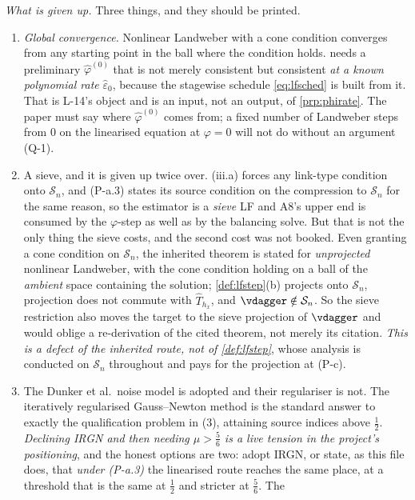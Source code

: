 \begin{remark}
\emph{What is given up.} Three things, and they should be printed.
\begin{enumerate}
\item[(a)] \emph{Global convergence.} Nonlinear Landweber with a cone condition converges from any
starting point in the ball where the condition holds.  needs a preliminary
$\hat\varphi^{(0)}$ that is not merely consistent but consistent \emph{at a known polynomial rate}
$\hat\varepsilon_0$, because the stagewise schedule \eqref{eq:lfsched} is built from it. That is L-14's
object and is an input, not an output, of \cref{prp:phirate}. The paper must say where
$\hat\varphi^{(0)}$ comes from; a fixed number of Landweber steps from $0$ on the linearised equation
at $\varphi=0$ will not do without an argument (Q-1).
\item[(b)] A sieve, and it is given up twice over. (iii.a) forces any
link-type condition onto $\mathcal S_n$, and (P-a.3) states its source condition on the compression to
$\mathcal S_n$ for the same reason, so the estimator is a \emph{sieve} LF and A8's upper end is
consumed by the $\varphi$-step as well as by the balancing solve. But that is not the only thing
the sieve costs, and the second cost was not booked. Even granting a cone condition on
$\mathcal S_n$, the inherited theorem is stated for \emph{unprojected} nonlinear Landweber, with the
cone condition holding on a ball of the \emph{ambient} space containing the solution;
\cref{def:lfstep}(b) projects onto $\mathcal S_n$, projection does not commute with $\hat T_{h_x}$, and
$\vdagger\notin\mathcal S_n$. So the sieve restriction also moves the target to the sieve projection of
$\vdagger$ and would oblige a re-derivation of the cited theorem, not merely its citation. \emph{This
is a defect of the inherited route, not of \cref{def:lfstep}}, whose analysis is conducted on
$\mathcal S_n$ throughout and pays for the projection at (P-c).
\item[(c)] The Dunker et al.\ noise model is adopted and their regulariser is not. The
iteratively regularised Gauss--Newton method \citep{dunker2021} is the standard answer to exactly the
qualification problem in (3), attaining source indices above $\tfrac12$. \emph{Declining IRGN and then
needing $\mu>\tfrac56$ is a live tension in the project's positioning}, and the honest options are two:
adopt IRGN, or state, as this file does, that \emph{under \textup{(P-a.3)}} the linearised route
reaches the same place, at a threshold that is the same at $\tfrac12$ and stricter at $\tfrac56$. The

\end{enumerate}
\end{remark}
